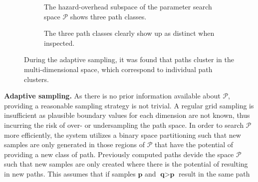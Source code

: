 \begin{figure}
\centering
\begin{subfigure}[b]{0.4\textwidth}
    \caption{The hazard-overhead subspace of the parameter search space $\mathcal{P}$ shows three path classes.}
    \label{contributions:usar:adaptive:space}
\end{subfigure}
\hspace*{1cm}
\begin{subfigure}[b]{0.3\textwidth}
    \caption{The three path classes clearly show up as distinct when inspected.}
    \label{contributions:usar:adaptive:rendering}
\end{subfigure}
\caption{During the adaptive sampling, it was found that paths cluster in the multi-dimensional space, which correspond to individual path clusters.}
\label{contributions:usar:adaptive}
\end{figure}

\textbf{Adaptive sampling.}  As there is no prior information available about $\mathcal{P}$, providing a reasonable sampling strategy is not trivial.  A regular grid sampling is insufficient as plausible boundary values for each dimension are not known, thus incurring the risk of over- or undersampling the path space.  In order to search $\mathcal{P}$ more efficiently, the system utilizes a binary space partitioning such that new samples are only generated in those regions of $\mathcal{P}$ that have the potential of providing a new class of path.  Previously computed paths devide the space $\mathcal{P}$ such that new samples are only created where there is the potential of resulting in new paths.  This assumes that if samples $\textbf{p}$ and $\textbf{q} > \textbf{p}$ result in the same path

